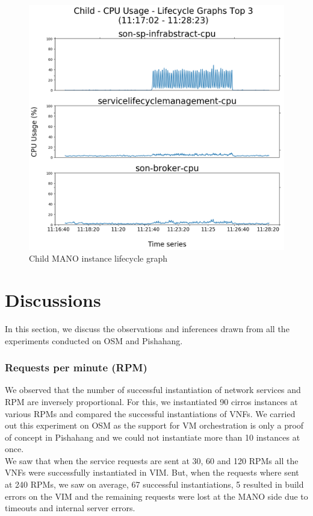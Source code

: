 \begin{figure}
	\centering
	\includegraphics[width=0.65\linewidth]{figures/scalability_graphs/Scalability-Evaluation/Child-TOP-3-Lifecycle}
	\caption{Child MANO instance lifecycle graph}
	\label{fig:child-top-3-lifecycle}
\end{figure}

\pagebreak

\section{Discussions}

In this section, we discuss the observations and inferences drawn from all the experiments conducted on OSM and Pishahang.

\subsubsection{Requests per minute (RPM)}

We observed that the number of successful instantiation of network services and RPM are inversely proportional. For this, we instantiated 90 cirros instances at various RPMs and compared the successful instantiations of VNFs. We carried out this experiment on OSM as the support for VM orchestration is only a proof of concept in Pishahang and we could not instantiate more than 10 instances at once. \\

We saw that when the service requests are sent at 30, 60 and 120 RPMs all the VNFs were successfully instantiated in VIM. But, when the requests where sent at 240 RPMs, we saw on average, 67 successful instantiations, 5 resulted in build errors on the VIM and the remaining requests were lost at the MANO side due to timeouts and internal server errors. \\ 

